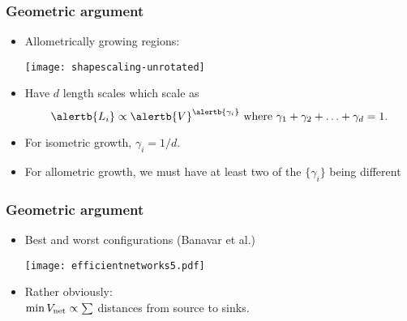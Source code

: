 \begin{frame}
  \frametitle{Geometric argument}

  \begin{itemize}
  \item<1-> Allometrically growing regions:
  \begin{center}
    \texttt{[image: shapescaling-unrotated]}    
  \end{center}
  \bigskip
  \item<1-> Have $d$ length scales which scale
    as 
    {
      $$
      \alertb{L_i} \propto \alertb{V}^{\alertb{\gamma_i}}
      \mbox{\ where $\gamma_1 + \gamma_2 + \ldots + \gamma_d = 1$.}
      $$
    }
  \item<1-> 
    For \alert{isometric} growth, $\gamma_i = 1/d$.
  \item<1->
    For \alert{allometric} growth, 
    we must have at least two of the $\{\gamma_i\}$ being different
  \end{itemize}

\end{frame}


\begin{frame}
  \frametitle{Geometric argument}

  \begin{itemize}
  \item<1-> Best and worst configurations (Banavar et al.)
    \begin{center}
      \texttt{[image: efficientnetworks5.pdf]}
    \end{center}
    \bigskip
  \item<2-> \alert{Rather obviously:}\\
    $\min V_{\textnormal{net}} \propto \sum$
    distances
    from source to sinks.

  \end{itemize}

\end{frame}

